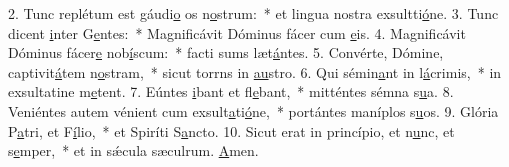 2. Tunc replétum est gáudi\uline{o} os n\uline{o}strum:~* et lingua nostra exsultti\uline{ó}ne.
3. Tunc dicent \uline{i}nter G\uline{e}ntes:~* Magnificávit Dóminus fácer cum \uline{e}is.
4. Magnificávit Dóminus fácer\uline{e} nob\uline{í}scum:~* facti sums læt\uline{á}ntes.
5. Convérte, Dómine, captivit\uline{á}tem n\uline{o}stram,~* sicut torrns in \uline{au}stro.
6. Qui sémin\uline{a}nt in l\uline{á}crimis,~* in exsultatine m\uline{e}tent.
7. Eúntes \uline{i}bant et fl\uline{e}bant,~* mitténtes sémna s\uline{u}a.
8. Veniéntes autem vénient cum exsult\uline{a}ti\uline{ó}ne,~* portántes maníplos s\uline{u}os.
9. Glória P\uline{a}tri, et F\uline{í}lio,~* et Spiríti S\uline{a}ncto.
10. Sicut erat in princípio, et n\uline{u}nc, et s\uline{e}mper,~* et in sǽcula sæculrum. \uline{A}men.
